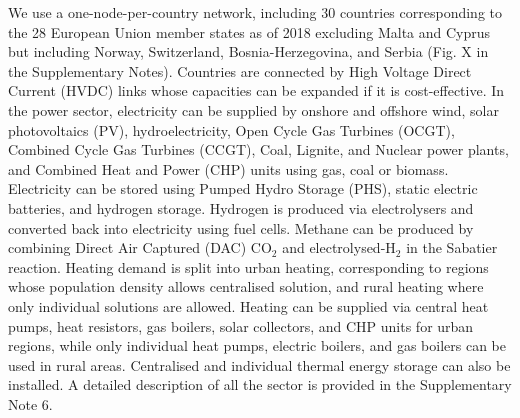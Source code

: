 \documentclass[5p]{elsarticle} %
\begin{document}
We use a one-node-per-country network, including 30 countries corresponding to the 28 European Union member states as of 2018 excluding Malta and Cyprus but including Norway, Switzerland, Bosnia-Herzegovina, and Serbia (Fig. \textcolor[rgb]{1,0,0}{X} in the Supplementary Notes). Countries are connected by High Voltage Direct Current (HVDC) links whose capacities can be expanded if it is cost-effective. In the power sector, electricity can be supplied by onshore and offshore wind, solar photovoltaics (PV), hydroelectricity, Open Cycle Gas Turbines (OCGT), Combined Cycle Gas Turbines (CCGT), Coal, Lignite, and Nuclear power plants, and Combined Heat and Power (CHP) units using gas, coal or biomass. Electricity can be stored using Pumped Hydro Storage (PHS), static electric batteries, and hydrogen storage. Hydrogen is produced via electrolysers and converted back into electricity using fuel cells. Methane can be produced by combining Direct Air Captured (DAC) CO$_2$ and electrolysed-H$_2$ in the Sabatier reaction.  
Heating demand is split into urban heating, corresponding to regions whose population density allows centralised solution, and rural heating where only individual solutions are allowed. Heating can be supplied via central heat pumps, heat resistors, gas boilers, solar collectors, and CHP units for urban regions, while only individual heat pumps, electric boilers, and gas boilers can be used in rural areas. Centralised and individual thermal energy storage can also be installed. A detailed description of all the sector is provided in the Supplementary Note 6. \
\end{document}
